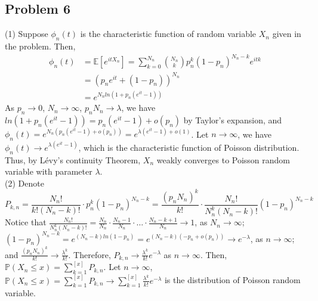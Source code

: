 \documentclass[12pt]{article}
\begin{document}
	\subsection*{Problem 6}
	(1) Suppose $\phi_{n}(t)$ is the characteristic function of random variable $X_{n}$ given in the problem. Then,
	\begin{align*}
	\phi_{n}(t)&= \mathbb{E}[e^{itX_{n}}]=\sum_{k=0}^{N_{n}}\binom{N_{n}}{k}p_n^{k}(1-p_n)^{N_{n}-k}e^{itk}\\
	&=(p_{n}e^{it}+(1-p_n))^{N_{n}}\\
	&=e^{N_{n}ln(1+p_{n}(e^{it}-1))}
\end{align*}
As $p_n\rightarrow 0$, $N_{n}\rightarrow\infty$, $p_{n}N_{n}\rightarrow \lambda$, we have $ln(1+p_{n}(e^{it}-1))=p_{n}(e^{it}-1)+o(p_{n})$ by Taylor's expansion, and $\phi_{n}(t)= e^{N_{n}(p_{n}(e^{it}-1)+o(p_{n}))}=e^{\lambda (e^{it}-1)+o(1)}$. Let $n\rightarrow\infty$, we have $\phi_{n}(t)\rightarrow e^{\lambda (e^{it}-1)}$, which is the characteristic function of Poisson distribution. Thus, by L\'{e}vy's continuity Theorem,  $X_{n}$ weakly converges to Poisson random variable with parameter $\lambda$.\\
(2) Denote $$P_{k,n}=\frac{N_{n}!}{k!(N_{n}-k)!}\cdot p_{n}^{k}(1-p_{n})^{N_{n}-k}=\frac{(p_{n}N_{n})^{k}}{k!}\cdot \frac{N_{n}!}{N_{n}^{k}(N_{n}-k)!}(1-p_{n})^{N_{n}-k}$$
Notice that $\frac{N_{n}!}{N_{n}^{k}(N_{n}-k)!}=\frac{N_{n}}{N_{n}}\cdot\frac{N_{n}-1}{N_{n}}\cdot\dots\cdot\frac{N_{n}-k+1}{N_{n}}\rightarrow 1$, as $N_{n}\rightarrow\infty$;\\ 

	$(1-p_{n})^{N_{n}-k}=e^{(N_{n}-k)ln(1-p_{n})}=e^{(N_{n}-k)(-p_{n}+o(p_{n}))}\rightarrow e^{-\lambda}$, as $n\rightarrow\infty$; \\ and $\frac{(p_{n}N_{n})^{k}}{k!}\rightarrow\frac{\lambda^{k}}{k!}$. Therefore, $P_{k,n}\rightarrow\frac{\lambda^{k}}{k!}e^{-\lambda}$ as $n\rightarrow\infty$. Then, $\mathbb{P}(X_{n}\leqslant x)=\sum_{k=1}^{[x]}P_{k,n}$. Let $n\rightarrow\infty$, $\mathbb{P}(X_{n}\leqslant x)=\sum_{k=1}^{[x]}P_{k,n}\rightarrow\sum_{k=1}^{[x]}\frac{\lambda^{k}}{k!}e^{-\lambda}$ is the distribution of Poisson random variable.
\end{document}
